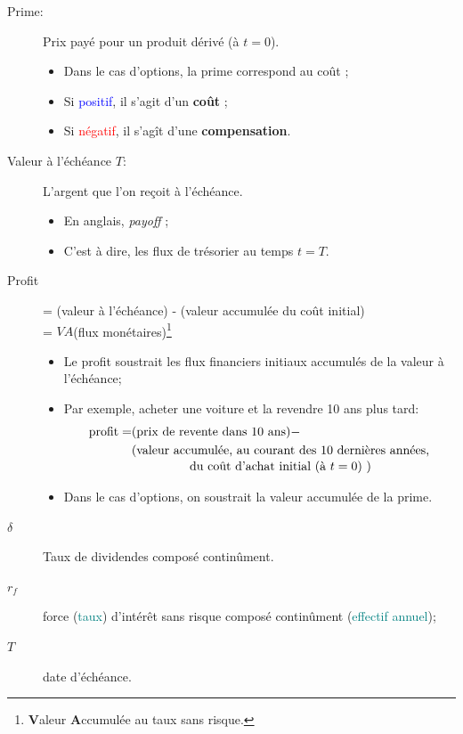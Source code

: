 \documentclass[10pt, french]{article}
\begin{document}
\begin{multicols*}{2}
\begin{distributions}[Terminologie]
\begin{description}
	\item[Prime:] Prix payé pour un produit dérivé (à $t	=	0$).
		\begin{itemize}[leftmargin = *]
		\item	Dans le cas d'options, la prime correspond au coût ;
		\item	Si \textcolor{blue}{positif}, il s'agit d'un \textbf{coût} ;
		\item	Si \textcolor{red}{négatif}, il s'agît d'une \textbf{compensation}.		
		\end{itemize}
	\item[Valeur à l'échéance $T$:]	L'argent que l'on reçoit à l'échéance.
		\begin{itemize}[leftmargin = *]
		\item	En anglais, \og \textit{payoff} \fg{} ;
		\item	C'est à dire, les flux de trésorier au temps $t = T$.
		\end{itemize}
	\item[Profit] 
		= (valeur à l'échéance) - (valeur accumulée du coût initial) \\
		= $VA$(flux monétaires)\footnote{\textbf{V}aleur \textbf{A}ccumulée au taux sans risque.}
		\begin{itemize}[leftmargin = *]
		\item	Le profit soustrait les flux financiers initiaux accumulés de la valeur à l'échéance;
		\item	Par exemple, acheter une voiture et la revendre 10 ans plus tard:
			\begin{align*}
			\text{profit} 
			=	&\text{(prix de revente dans 10 ans)} -\\ &\text{\shortstack{(valeur accumulée, au courant des 10 dernières années,\\ du coût d'achat initial (à $t = 0$) )}}
			\end{align*}
		\item	Dans le cas d'options, on soustrait la valeur accumulée de la prime.
		\end{itemize}
	\tcbline
	\item[$\delta$]	Taux de dividendes composé continûment.
	\item[$r_{f}$] 	\textcolor{amethyst}{force} (\textcolor{teal}{taux}) d'intérêt sans risque \textcolor{amethyst}{composé continûment} (\textcolor{teal}{effectif annuel});
	\item[$T$]	date d'échéance.
\end{description}
\end{distributions}


\end{multicols*}
\end{document}
